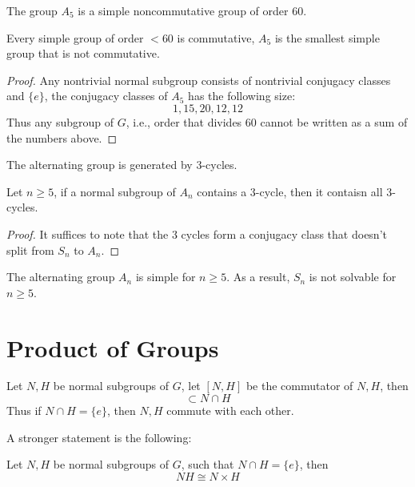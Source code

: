 \documentclass[openany]{book}
\begin{document}
\begin{prop}
    The group $A_5$ is a simple noncommutative group of order $60$. 
\end{prop}
\begin{prop}
    Every simple group of order $<60$ is commutative, $A_5$ is the smallest simple group that is not commutative.
\end{prop}

\begin{proof}
    Any nontrivial normal subgroup consists of nontrivial conjugacy classes and $\{e\}$, the conjugacy classes of $A_5$ has the following size:
    \begin{equation*}
        1, 15, 20, 12, 12
    \end{equation*}
    Thus any subgroup of $G$, i.e., order that divides $60$ cannot be written as a sum of the numbers above.
\end{proof}

\begin{prop}
    The alternating group is generated by $3$-cycles.
\end{prop}

\begin{prop}
    Let $n\geq 5$, if a normal subgroup of $A_n$ contains a $3$-cycle, then it contaisn all $3$-cycles.
\end{prop}
\begin{proof}
    It suffices to note that the $3$ cycles form a conjugacy class that doesn't split from $S_n$ to $A_n$.
\end{proof}
\begin{prop}
    The alternating group $A_n$ is simple for $n\geq 5$. As a result, $S_n$ is not solvable for $n\geq 5$.
\end{prop}

\section{Product of Groups}
\begin{prop}
    Let $N,H$ be normal subgroups of $G$, let $[N,H]$ be the commutator of $N,H$, then 
    \begin{equation*}
        [N,H]\subset N\cap H
    \end{equation*}
    Thus if $N\cap H=\{e\}$, then $N,H$ commute with each other.
\end{prop}
A stronger statement is the following:

\begin{thm}
    Let $N,H$ be normal subgroups of $G$, such that $N\cap H=\{e\}$, then 
    \begin{equation*}
        NH\cong N\times H
    \end{equation*}
\end{thm}
\end{document}
